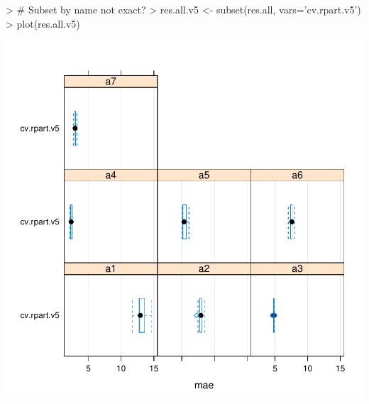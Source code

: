 \documentclass{article}
\begin{document}
\begin{Schunk}
\begin{Sinput}
> # Subset by name not exact?
> res.all.v5 <- subset(res.all, vars='cv.rpart.v5')
> plot(res.all.v5)
\end{Sinput}
\end{Schunk}
\includegraphics{KevinZollicoffer_Assignment2-011}
\end{document}
